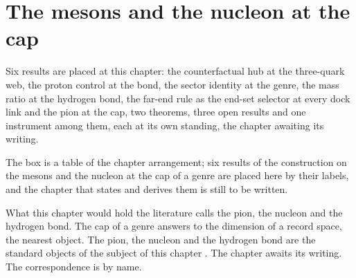 \section{The mesons and the nucleon at the cap}\label{mod:VII-9-mesons-and-the-nucleon-at-the-cap}
\begin{chtable}
Six results are placed at this chapter: the counterfactual hub at the three-quark web, the proton control at the bond, the sector identity at the genre, the mass ratio at the hydrogen bond, the far-end rule as the end-set selector at every dock link and the pion at the cap, two theorems, three open results and one instrument among them, each at its own standing, the chapter awaiting its writing.
\end{chtable}
\chdeps{}{}
The box is a table of the chapter arrangement; six results of the construction on the mesons and the nucleon at the cap of a genre are placed here by their labels, and the chapter that states and derives them is still to be written.
\begin{chbridge}
What this chapter would hold the literature calls the pion, the nucleon and the hydrogen bond. The cap of a genre answers to the dimension of a record space, the nearest object. The pion, the nucleon and the hydrogen bond are the standard objects of the subject of this chapter \cite{Yukawa1935}. The chapter awaits its writing. The correspondence is by name.
\end{chbridge}
